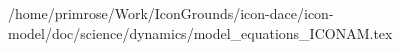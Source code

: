 /home/primrose/Work/IconGrounds/icon-dace/icon-model/doc/science/dynamics/model_equations_ICONAM.tex